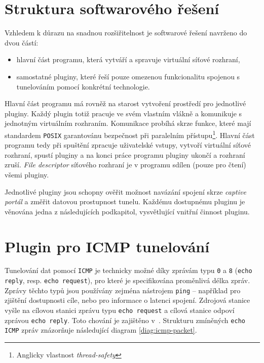 \documentclass[thesis=M,czech]{FITthesis}[2012/10/20]
\begin{document}
\section{Struktura softwarového řešení}

Vzhledem k důrazu na snadnou rozšiřitelnost je softwarové řešení navrženo do dvou částí:

\begin{itemize}
 \item hlavní část programu, která vytváří a spravuje virtuální síťové rozhraní,
 \item samostatné pluginy, které řeší pouze omezenou funkcionalitu spojenou s tunelováním pomocí konkrétní technologie.
\end{itemize}

Hlavní část programu má rovněž na starost vytvoření prostředí pro jednotlivé pluginy. Každý plugin totiž pracuje ve svém vlastním vlákně a komunikuje s jednotným virtuálním rozhraním. Komunikace probíhá skrze funkce, které mají standardem \texttt{POSIX} garantovánu bezpečnost při paralelním přístupu\footnote{Anglicky vlastnost \textit{thread-safety}}. Hlavní část programu tedy při spuštění zpracuje uživatelské vstupy, vytvoří virtuální síťové rozhraní, spustí pluginy a na konci práce programu pluginy ukončí a rozhraní zruší. \textit{File descriptor} síťového rozhraní je v programu sdílen (pouze pro čtení) všemi pluginy.

Jednotlivé pluginy jsou schopny ověřit možnost navázání spojení skrze \textit{captive portál} a změřit datovou prostupnost tunelu. Každému dostupnému pluginu je věnována jedna z následujících podkapitol, vysvětlující vnitřní činnost pluginu.


\section{Plugin pro ICMP tunelování}

Tunelování dat pomocí \texttt{ICMP} je technicky možné díky zprávám typu \texttt{0} a \texttt{8} (\texttt{echo reply}, resp. \texttt{echo request}), pro které je specifikována proměnlivá délka zpráv. Zprávy těchto typů jsou používány zejména nástrojem \texttt{ping} -- například pro zjištění dostupnosti cíle, nebo pro informace o latenci spojení. Zdrojová stanice vyšle na cílovou stanici zprávu typu \texttt{echo request} a cílová stanice odpoví zprávou \texttt{echo reply}. Toto chování je zajištěno v~\cite[RFC1122]{rfc1122}. Strukturu zmíněných \texttt{echo} \texttt{ICMP} zpráv znázorňuje následující diagram \ref{diag:icmp-packet}.
\end{document}

